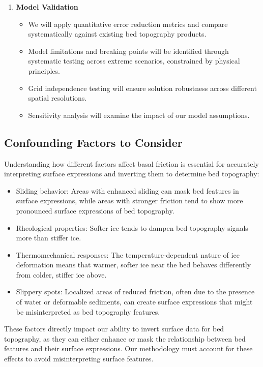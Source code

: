 \begin{enumerate}
\item\textbf{Model Validation}
    \begin{itemize}
    \item We will apply quantitative error reduction metrics and compare systematically against existing bed topography products.
    
    \item Model limitations and breaking points will be identified through systematic testing across extreme scenarios, constrained by physical principles.
    
    \item Grid independence testing will ensure solution robustness across different spatial resolutions.
    
    \item Sensitivity analysis will examine the impact of our model assumptions.
    \end{itemize}
\end{enumerate}


\subsection*{Confounding Factors to Consider}

Understanding how different factors affect basal friction is essential for accurately interpreting surface expressions and inverting them to determine bed topography:

\begin{itemize}
    \item Sliding behavior: Areas with enhanced sliding can mask bed features in surface expressions, while areas with stronger friction tend to show more pronounced surface expressions of bed topography.
    
    \item Rheological properties: Softer ice tends to dampen bed topography signals more than stiffer ice.
    
    \item Thermomechanical responses: The temperature-dependent nature of ice deformation means that warmer, softer ice near the bed behaves differently from colder, stiffer ice above.
    
    \item Slippery spots: Localized areas of reduced friction, often due to the presence of water or deformable sediments, can create surface expressions that might be misinterpreted as bed topography features.
\end{itemize}

These factors directly impact our ability to invert surface data for bed topography, as they can either enhance or mask the relationship between bed features and their surface expressions. Our methodology must account for these effects to avoid misinterpreting surface features.

